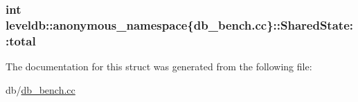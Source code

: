 \subsubsection[{total}]{\setlength{\rightskip}{0pt plus 5cm}int leveldb\+::anonymous\+\_\+namespace\{db\+\_\+bench.\+cc\}\+::Shared\+State\+::total}\label{structleveldb_1_1anonymous__namespace_02db__bench_8cc_03_1_1_shared_state_a89bdd25e1515a59494cb1cc4b11283c0}


The documentation for this struct was generated from the following file\+:\begin{DoxyCompactItemize}
\item 
db/\hyperlink{db__bench_8cc}{db\+\_\+bench.\+cc}\end{DoxyCompactItemize}
